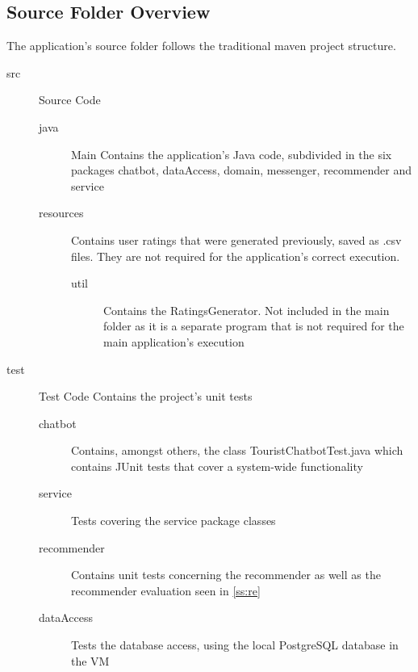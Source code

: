 \subsection{Source Folder Overview} \label{ss:sfo}
The application’s source folder follows the traditional maven project structure.
\begin{description}
\item[src] Source Code
\begin{description}
\item[java] Main Contains the application’s Java code, subdivided in the six packages chatbot, dataAccess, domain, messenger, recommender and service
\item[resources]  Contains user ratings that were generated previously, saved as .csv files. They are not required for the application's correct execution.
\begin{description}
\item[util] Contains the RatingsGenerator. Not included in the main folder as it is a separate program that is not required for the main application’s execution
\end{description}
\end{description}
\item[test] Test Code Contains the project's unit tests
\begin{description}
\item[chatbot] Contains, amongst others, the class TouristChatbotTest.java which contains JUnit tests that cover a system-wide functionality
\item[service] Tests covering the service package classes
\item[recommender] Contains unit tests concerning the recommender as well as the recommender evaluation seen in \ref{ss:re}
\item[dataAccess] Tests the database access, using the local PostgreSQL database in the VM
\end{description}
\end{description}

